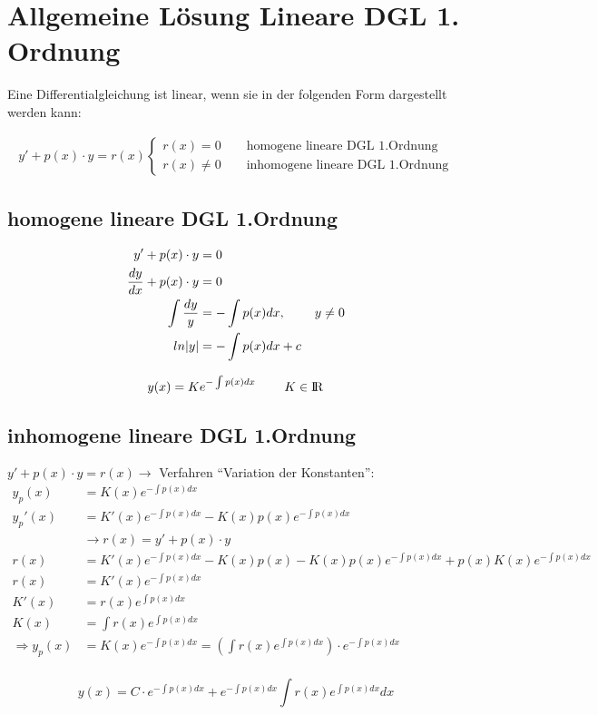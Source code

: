 \section{Allgemeine L\"osung Lineare DGL 1. Ordnung}

Eine Differentialgleichung ist linear, wenn sie in der folgenden Form dargestellt werden kann:

\begin{align*}
    y'+p(x)\cdot y = r(x)\begin{cases}
r(x) = 0 \qquad\text{homogene lineare DGL 1.Ordnung}\\
r(x) \neq 0 \qquad \text{inhomogene lineare DGL 1.Ordnung}
\end{cases}
\end{align*}

\subsection{homogene lineare DGL 1.Ordnung}

\begin{align*}
    y' + p(x)\cdot y            &= 0                  \\
    \frac{dy}{dx} + p(x)\cdot y &= 0                  \\
    \int\frac{dy}{y}            &= -\int p(x)dx       ,\hspace{8mm}y \neq 0 \\
    ln\lvert y\lvert            &= -\int p(x)dx + c   \\
\end{align*}

\begin{equation*}[box=\widebox]
    y(x) = Ke^{-\int p(x)dx}       \hspace{8mm} K\in{\rm I\!R}
\end{equation*}

\subsection{inhomogene lineare DGL 1.Ordnung}

$y' + p(x) \cdot y = r(x) \rightarrow$ Verfahren ``Variation der Konstanten'':
\begin{align*}
    y_p(x)             &= K(x)e^{-\int p(x)dx} \\
    y_p'(x)            &= K'(x)e^{-\int p(x)dx} - K(x)p(x)e^{-\int{p(x)dx}} \\
                       &\rightarrow r(x) = y' + p(x) \cdot y \\
    r(x)               &= K'(x)e^{-\int p(x)dx} - K(x)p(x) - K(x)p(x)e^{-\int p(x)dx} + p(x)K(x)e^{-\int p(x)dx} \\
    r(x)               &= K'(x)e^{-\int p(x)dx} \\
    K'(x)              &= r(x)e^{\int p(x)dx} \\
    K(x)               &= \int r(x)e^{\int p(x)dx} \\
    \Rightarrow y_p(x) &= K(x)e^{-\int p(x)dx} = \left(\int r(x)e^{\int p(x)dx}\right) \cdot e^{-\int p(x)dx} \\
\end{align*}

\begin{equation*}[box=\widebox]
    y(x) = C \cdot e^{-\int p(x)dx} + e^{-\int p(x)dx} \int r(x)e^{\int p(x)dx}dx
\end{equation*}

